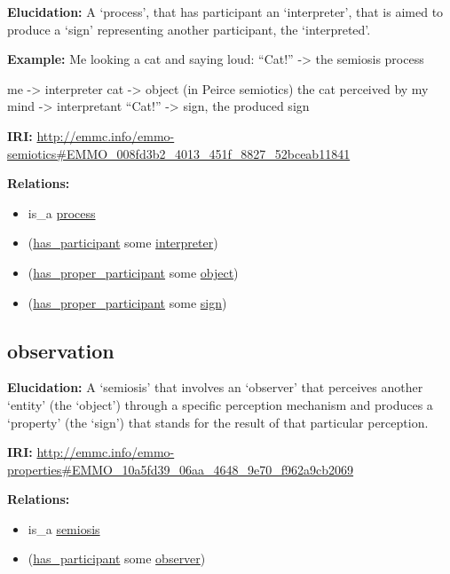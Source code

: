 \documentclass[a4paper,]{report}
\providecommand{\tightlist}{%
  \setlength{\itemsep}{0pt}\setlength{\parskip}{0pt}}
\begin{document}
\textbf{Elucidation:} A `process', that has participant an
`interpreter', that is aimed to produce a `sign' representing another
participant, the `interpreted'.

\textbf{Example:} Me looking a cat and saying loud: ``Cat!''
-\textgreater{} the semiosis process

me -\textgreater{} interpreter cat -\textgreater{} object (in Peirce
semiotics) the cat perceived by my mind -\textgreater{} interpretant
``Cat!'' -\textgreater{} sign, the produced sign

\textbf{IRI:}
\url{http://emmc.info/emmo-semiotics\#EMMO_008fd3b2_4013_451f_8827_52bceab11841}

\textbf{Relations:}

\begin{itemize}
\tightlist
\item
  is\_a \protect\hyperlink{process}{process}
\item
  (\protect\hyperlink{has_participant}{has\_participant} some
  \protect\hyperlink{interpreter}{interpreter})
\item
  (\protect\hyperlink{has_proper_participant}{has\_proper\_participant}
  some \protect\hyperlink{object}{object})
\item
  (\protect\hyperlink{has_proper_participant}{has\_proper\_participant}
  some \protect\hyperlink{sign}{sign})
\end{itemize}

\hypertarget{observation}{%
\subsection{observation}\label{observation}}

\textbf{Elucidation:} A `semiosis' that involves an `observer' that
perceives another `entity' (the `object') through a specific perception
mechanism and produces a `property' (the `sign') that stands for the
result of that particular perception.

\textbf{IRI:}
\url{http://emmc.info/emmo-properties\#EMMO_10a5fd39_06aa_4648_9e70_f962a9cb2069}

\textbf{Relations:}

\begin{itemize}
\tightlist
\item
  is\_a \protect\hyperlink{semiosis}{semiosis}
\item
  (\protect\hyperlink{has_participant}{has\_participant} some
  \protect\hyperlink{observer}{observer})
\end{itemize}
\end{document}
